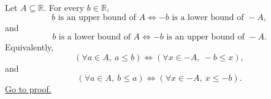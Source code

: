 \begin{corollary}
\label{cor:reflection-swaps-upper-lower-bounds}
Let $A\subseteq\mathbb{R}$. For every $b\in\mathbb{R}$,
\[
b\text{ is an upper bound of }A
\Longleftrightarrow
-b\text{ is a lower bound of }-A,
\]
and
\[
b\text{ is a lower bound of }A
\Longleftrightarrow
-b\text{ is an upper bound of }-A.
\]
Equivalently,
\[
\left(\forall a\in A,\ a\leq b\right)
\Longleftrightarrow
\left(\forall x\in -A,\ -b\leq x\right),
\]
and
\[
\left(\forall a\in A,\ b\leq a\right)
\Longleftrightarrow
\left(\forall x\in -A,\ x\leq -b\right).
\]
\hyperref[prf:reflection-swaps-upper-lower-bounds]{Go to proof.}
\end{corollary}